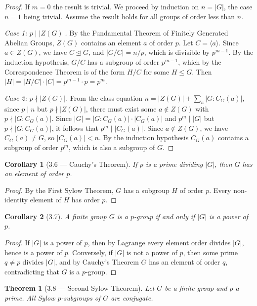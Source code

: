 \documentclass[12pt]{article}
\newtheorem{theorem}{Theorem}
\newtheorem{corollary}{Corollary}
\begin{document}
\begin{proof}
If $m = 0$ the result is trivial. We proceed by induction on $n = |G|$, the case $n = 1$ being trivial. Assume the result holds for all groups of order less than $n$.

\textit{Case 1: $p \mid |Z(G)|$.} By the Fundamental Theorem of Finitely Generated Abelian Groups, $Z(G)$ contains an element $a$ of order $p$. Let $C = \langle a \rangle$. Since $a \in Z(G)$, we have $C \trianglelefteq G$, and $|G/C| = n/p$, which is divisible by $p^{m-1}$. By the induction hypothesis, $G/C$ has a subgroup of order $p^{m-1}$, which by the Correspondence Theorem is of the form $H/C$ for some $H \leq G$. Then $|H| = |H/C| \cdot |C| = p^{m-1} \cdot p = p^m$.

\textit{Case 2: $p \nmid |Z(G)|$.} From the class equation $n = |Z(G)| + \sum_a |G : C_G(a)|$, since $p \mid n$ but $p \nmid |Z(G)|$, there must exist some $a \notin Z(G)$ with $p \nmid |G : C_G(a)|$. Since $|G| = |G : C_G(a)| \cdot |C_G(a)|$ and $p^m \mid |G|$ but $p \nmid |G : C_G(a)|$, it follows that $p^m \mid |C_G(a)|$. Since $a \notin Z(G)$, we have $C_G(a) \neq G$, so $|C_G(a)| < n$. By the induction hypothesis $C_G(a)$ contains a subgroup of order $p^m$, which is also a subgroup of $G$.
\end{proof}

\begin{corollary}[3.6 — Cauchy's Theorem]
If $p$ is a prime dividing $|G|$, then $G$ has an element of order $p$.
\end{corollary}

\begin{proof}
By the First Sylow Theorem, $G$ has a subgroup $H$ of order $p$. Every non-identity element of $H$ has order $p$.
\end{proof}

\begin{corollary}[3.7]
A finite group $G$ is a $p$-group if and only if $|G|$ is a power of $p$.
\end{corollary}

\begin{proof}
If $|G|$ is a power of $p$, then by Lagrange every element order divides $|G|$, hence is a power of $p$. Conversely, if $|G|$ is not a power of $p$, then some prime $q \neq p$ divides $|G|$, and by Cauchy's Theorem $G$ has an element of order $q$, contradicting that $G$ is a $p$-group.
\end{proof}



\begin{theorem}[3.8 — Second Sylow Theorem]
Let $G$ be a finite group and $p$ a prime. All Sylow $p$-subgroups of $G$ are conjugate.
\end{theorem}
\end{document}
